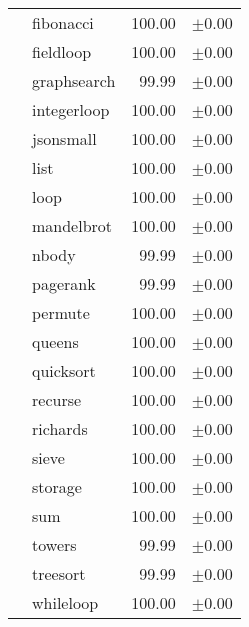 \begin{tabular}{ll@{\hspace{6pt}}r@{\hspace{3pt}}l}
 & fibonacci & 100.00 & \scriptsize\textcolor{gray!60}{$\pm$0.00} \\
 & fieldloop & 100.00 & \scriptsize\textcolor{gray!60}{$\pm$0.00} \\
 & graphsearch & 99.99 & \scriptsize\textcolor{gray!60}{$\pm$0.00} \\
 & integerloop & 100.00 & \scriptsize\textcolor{gray!60}{$\pm$0.00} \\
 & jsonsmall & 100.00 & \scriptsize\textcolor{gray!60}{$\pm$0.00} \\
 & list & 100.00 & \scriptsize\textcolor{gray!60}{$\pm$0.00} \\
 & loop & 100.00 & \scriptsize\textcolor{gray!60}{$\pm$0.00} \\
 & mandelbrot & 100.00 & \scriptsize\textcolor{gray!60}{$\pm$0.00} \\
 & nbody & 99.99 & \scriptsize\textcolor{gray!60}{$\pm$0.00} \\
 & pagerank & 99.99 & \scriptsize\textcolor{gray!60}{$\pm$0.00} \\
 & permute & 100.00 & \scriptsize\textcolor{gray!60}{$\pm$0.00} \\
 & queens & 100.00 & \scriptsize\textcolor{gray!60}{$\pm$0.00} \\
 & quicksort & 100.00 & \scriptsize\textcolor{gray!60}{$\pm$0.00} \\
 & recurse & 100.00 & \scriptsize\textcolor{gray!60}{$\pm$0.00} \\
 & richards & 100.00 & \scriptsize\textcolor{gray!60}{$\pm$0.00} \\
 & sieve & 100.00 & \scriptsize\textcolor{gray!60}{$\pm$0.00} \\
 & storage & 100.00 & \scriptsize\textcolor{gray!60}{$\pm$0.00} \\
 & sum & 100.00 & \scriptsize\textcolor{gray!60}{$\pm$0.00} \\
 & towers & 99.99 & \scriptsize\textcolor{gray!60}{$\pm$0.00} \\
 & treesort & 99.99 & \scriptsize\textcolor{gray!60}{$\pm$0.00} \\
 & whileloop & 100.00 & \scriptsize\textcolor{gray!60}{$\pm$0.00} \\
\bottomrule
\end{tabular}

